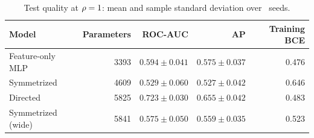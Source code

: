 \begin{table}[H]
\centering
\small
\caption{Test quality at $\rho=1$: mean and sample standard deviation over \ExperimentSeedCount\ seeds.}
\label{tab:baseline}
\begin{tabular}{lrrrr}
\toprule
Model & Parameters & ROC-AUC & AP & Training BCE \\
\midrule
Feature-only MLP & 3393 & $0.594 \pm 0.041$ & $0.575 \pm 0.037$ & 0.476 \\
Symmetrized & 4609 & $0.529 \pm 0.060$ & $0.527 \pm 0.042$ & 0.646 \\
Directed & 5825 & $0.723 \pm 0.030$ & $0.655 \pm 0.042$ & 0.483 \\
Symmetrized (wide) & 5841 & $0.575 \pm 0.050$ & $0.559 \pm 0.035$ & 0.523 \\
\bottomrule
\end{tabular}
\end{table}
